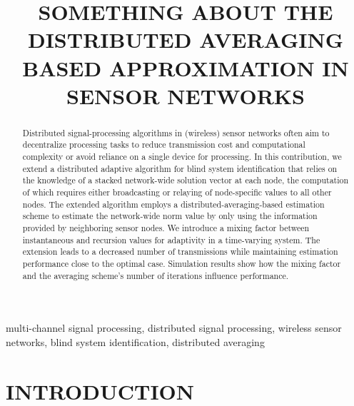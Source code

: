 \documentclass{article}
\title{SOMETHING ABOUT THE DISTRIBUTED AVERAGING BASED APPROXIMATION IN SENSOR NETWORKS}
\begin{document}
%
\maketitle
%
\begin{abstract}
  Distributed signal-processing algorithms in (wireless) sensor networks often aim to decentralize processing tasks to reduce transmission cost and computational complexity or avoid reliance on a single device for processing. In this contribution, we extend a distributed adaptive algorithm for blind system identification that relies on the knowledge of a stacked network-wide solution vector at each node, the computation of which requires either broadcasting or relaying of node-specific values to all other nodes. The extended algorithm employs a distributed-averaging-based estimation scheme to estimate the network-wide norm value by only using the information provided by neighboring sensor nodes. We introduce a mixing factor between instantaneous and recursion values for adaptivity in a time-varying system. The extension leads to a decreased number of transmissions while maintaining estimation performance close to the optimal case. Simulation results show how the mixing factor and the averaging scheme's number of iterations influence performance.
\end{abstract}
%
\begin{keywords}
multi-channel signal processing, distributed signal processing, wireless sensor networks, blind system identification, distributed averaging
\end{keywords}
%
\section{INTRODUCTION}
\label{sec:intro}
\end{document}
